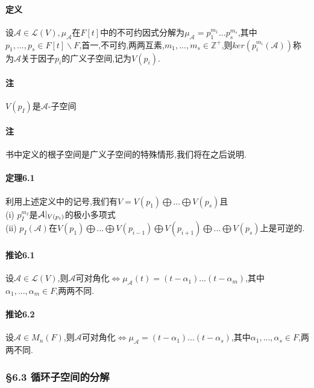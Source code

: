 \documentclass{ctexart}
\begin{document}
\paragraph{定义}
设$\mathcal{A}\in \mathcal{L}(V),\mu_{\mathcal{A}}$在$F[t]$中的不可约因式分解为$\mu_{\mathcal{A}}=p_{1}^{m_{1}}...p_{s}^{m_{s}}$,其中$p_{1},...,p_{s} \in F[t] \backslash F$,首一,不可约,两两互素,$m_{1},...,m_{s} \in \mathbb{Z}^{+}$,则$ker(p_{i}^{m_{i}}(\mathcal{A}))$称为$\mathcal{A}$关于因子$p_{i}$的广义子空间,记为$V(p_{i})$.

\paragraph{注}
$V(p_{I})$是$\mathcal{A}$-子空间

\paragraph{注}
书中定义的根子空间是广义子空间的特殊情形,我们将在之后说明.

\paragraph{定理6.1}
利用上述定义中的记号,我们有$V=V(p_{1})\bigoplus ... \bigoplus V(p_{s})$且\\
(i) $p_{I}^{m_{I}}$是$\mathcal{A}\arrowvert_{V(p_{i})}$的极小多项式\\
(ii) $p_{I}(\mathcal{A})$在$V(p_{1})\bigoplus ... \bigoplus V(p_{i-1}) \bigoplus V(p_{i+1})\bigoplus ... \bigoplus V(p_{s})$上是可逆的.

\paragraph{推论6.1}
设$\mathcal{A}\in\mathcal{L}(V)$,则$\mathcal{A}$可对角化$\Leftrightarrow \mu_{\mathcal{A}}(t) = (t-\alpha_{1})...(t-\alpha_{m})$,其中$\alpha_{1},...,\alpha_{m} \in F$,两两不同.

\paragraph{推论6.2}
设$\mathcal{A} \in M_{n}(F)$,则$\mathcal{A}$可对角化$\Leftrightarrow \mu_{\mathcal{A}}=(t-\alpha_{1})...(t-\alpha_{s})$,其中$\alpha_{1},...,\alpha_{s} \in F$,两两不同.

\subsubsection{§6.3 循环子空间的分解}
\end{document}
